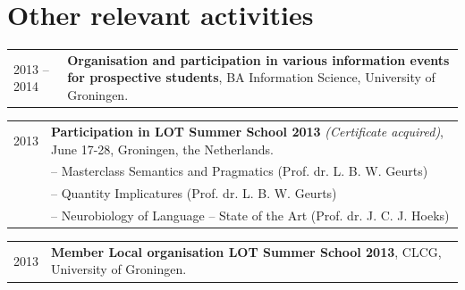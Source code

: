 \documentclass[a4paper,10pt]{article}
\def\leftcolwidth{.12\textwidth}
\def\tablevspace{10pt}
\begin{document}
\section*{Other relevant activities}

%

\noindent
\begin{tabularx}{\textwidth}{ p{\leftcolwidth} X }
  2013 -- 2014
  & \textbf{Organisation and participation in various information events for
    prospective students}, BA Information Science, University of Groningen.\\
\end{tabularx}

\vspace{\tablevspace}

\noindent
\begin{tabularx}{\textwidth}{ p{\leftcolwidth} X }
  2013 & \textbf{Participation in LOT Summer School 2013} 
         \textit{(Certificate acquired)}, June 17-28, 
         Groningen, the Netherlands.\\
       & -- {Masterclass Semantics and Pragmatics} (Prof. dr. L. B. W. Geurts)\\
       & -- {Quantity Implicatures} (Prof. dr. L. B. W. Geurts)\\
       & -- {Neurobiology of Language -- State of the Art} (Prof. dr. J. C. J. Hoeks)\\
\end{tabularx}

\vspace{\tablevspace}

\noindent
\begin{tabularx}{\textwidth}{ p{\leftcolwidth} X }
  2013
  & \textbf{Member Local organisation LOT Summer School 2013},
    CLCG, University of Groningen.\\
\end{tabularx}
\end{document}
